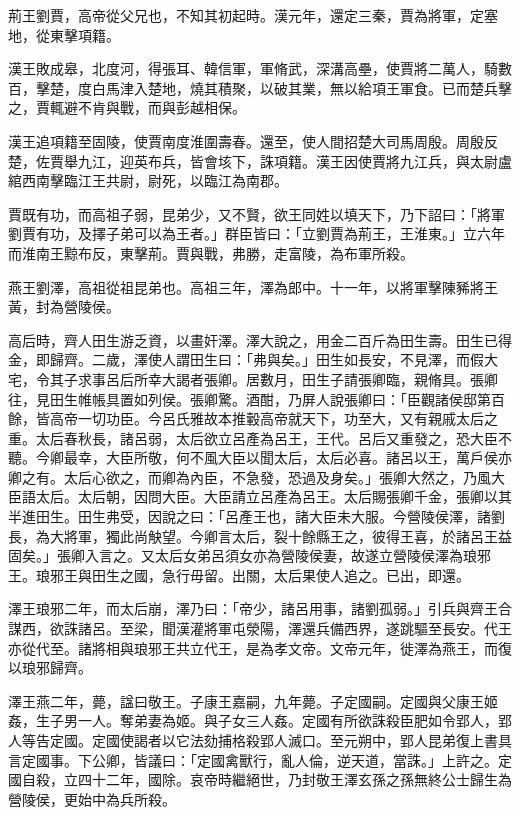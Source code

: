 
\begin{pinyinscope}
荊王劉賈，高帝從父兄也，不知其初起時。漢元年，還定三秦，賈為將軍，定塞地，從東擊項籍。

漢王敗成皋，北度河，得張耳、韓信軍，軍脩武，深溝高壘，使賈將二萬人，騎數百，擊楚，度白馬津入楚地，燒其積聚，以破其業，無以給項王軍食。已而楚兵擊之，賈輒避不肯與戰，而與彭越相保。

漢王追項籍至固陵，使賈南度淮圍壽春。還至，使人間招楚大司馬周殷。周殷反楚，佐賈舉九江，迎英布兵，皆會垓下，誅項籍。漢王因使賈將九江兵，與太尉盧綰西南擊臨江王共尉，尉死，以臨江為南郡。

賈既有功，而高祖子弱，昆弟少，又不賢，欲王同姓以填天下，乃下詔曰：「將軍劉賈有功，及擇子弟可以為王者。」群臣皆曰：「立劉賈為荊王，王淮東。」立六年而淮南王黥布反，東擊荊。賈與戰，弗勝，走富陵，為布軍所殺。

燕王劉澤，高祖從祖昆弟也。高祖三年，澤為郎中。十一年，以將軍擊陳豨將王黃，封為營陵侯。

高后時，齊人田生游乏資，以畫奸澤。澤大說之，用金二百斤為田生壽。田生已得金，即歸齊。二歲，澤使人謂田生曰：「弗與矣。」田生如長安，不見澤，而假大宅，令其子求事呂后所幸大謁者張卿。居數月，田生子請張卿臨，親脩具。張卿往，見田生帷帳具置如列侯。張卿驚。酒酣，乃屏人說張卿曰：「臣觀諸侯邸第百餘，皆高帝一切功臣。今呂氏雅故本推轂高帝就天下，功至大，又有親戚太后之重。太后春秋長，諸呂弱，太后欲立呂產為呂王，王代。呂后又重發之，恐大臣不聽。今卿最幸，大臣所敬，何不風大臣以聞太后，太后必喜。諸呂以王，萬戶侯亦卿之有。太后心欲之，而卿為內臣，不急發，恐過及身矣。」張卿大然之，乃風大臣語太后。太后朝，因問大臣。大臣請立呂產為呂王。太后賜張卿千金，張卿以其半進田生。田生弗受，因說之曰：「呂產王也，諸大臣未大服。今營陵侯澤，諸劉長，為大將軍，獨此尚觖望。今卿言太后，裂十餘縣王之，彼得王喜，於諸呂王益固矣。」張卿入言之。又太后女弟呂須女亦為營陵侯妻，故遂立營陵侯澤為琅邪王。琅邪王與田生之國，急行毋留。出關，太后果使人追之。已出，即還。

澤王琅邪二年，而太后崩，澤乃曰：「帝少，諸呂用事，諸劉孤弱。」引兵與齊王合謀西，欲誅諸呂。至梁，聞漢灌將軍屯滎陽，澤還兵備西界，遂跳驅至長安。代王亦從代至。諸將相與琅邪王共立代王，是為孝文帝。文帝元年，徙澤為燕王，而復以琅邪歸齊。

澤王燕二年，薨，諡曰敬王。子康王嘉嗣，九年薨。子定國嗣。定國與父康王姬姦，生子男一人。奪弟妻為姬。與子女三人姦。定國有所欲誅殺臣肥如令郢人，郢人等告定國。定國使謁者以它法劾捕格殺郢人滅口。至元朔中，郢人昆弟復上書具言定國事。下公卿，皆議曰：「定國禽獸行，亂人倫，逆天道，當誅。」上許之。定國自殺，立四十二年，國除。哀帝時繼絕世，乃封敬王澤玄孫之孫無終公士歸生為營陵侯，更始中為兵所殺。


\end{pinyinscope}
